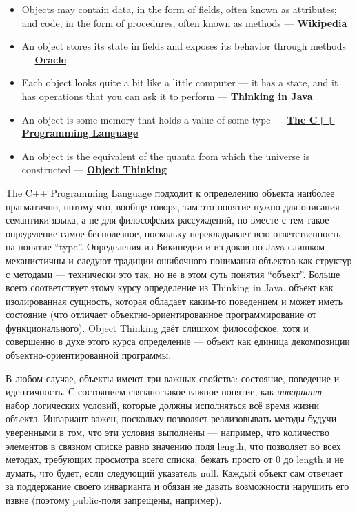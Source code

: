 \documentclass[a5paper]{article}
\begin{document}
\begin{itemize}
	\item Objects may contain data, in the form of fields, often known as attributes; and code, in the form of procedures, often known as methods --- \textbf{\href{https://en.wikipedia.org/wiki/Object-oriented\_programming}{Wikipedia}}
	\item An object stores its state in fields and exposes its behavior through methods --- \textbf{\href{https://docs.oracle.com/javase/tutorial/java/concepts/object.html}{Oracle}}
	\item Each object looks quite a bit like a little computer --- it has a state, and it has operations that you can ask it to perform --- \textbf{\href{http://amzn.to/1PBmQpm}{Thinking in Java}}
	\item An object is some memory that holds a value of some type --- \textbf{\href{http://amzn.to/1XyGCtk}{The C++ Programming Language}}
	\item An object is the equivalent of the quanta from which the universe is constructed --- \textbf{\href{http://amzn.to/266oJr4}{Object Thinking}}
\end{itemize}

The C++ Programming Language подходит к определению объекта наиболее прагматично, потому что, вообще говоря, там это понятие нужно для описания семантики языка, а не для философских рассуждений, но вместе с тем такое определение самое бесполезное, поскольку перекладывает всю ответственность на понятие ``type''. Определения из Википедии и из доков по Java слишком механистичны и следуют традиции ошибочного понимания объектов как структур с методами --- технически это так, но не в этом суть понятия ``объект''. Больше всего соответствует этому курсу определение из Thinking in Java, объект как изолированная сущность, которая обладает каким-то поведением и может иметь состояние (что отличает объектно-ориентированное программирование от функционального). Object Thinking даёт слишком философское, хотя и совершенно в духе этого курса определение --- объект как единица декомпозиции объектно-ориентированной программы.

В любом случае, объекты имеют три важных свойства: состояние, поведение и идентичность. С состоянием связано такое важное понятие, как \textit{инвариант} --- набор логических условий, которые должны исполняться всё время жизни объекта. Инвариант важен, поскольку позволяет реализовывать методы будучи уверенными в том, что эти условия выполнены --- например, что количество элементов в связном списке равно значению поля length, что позволяет во всех методах, требующих просмотра всего списка, бежать просто от 0 до length и не думать, что будет, если следующий указатель null. Каждый объект сам отвечает за поддержание своего инварианта и обязан не давать возможности нарушить его извне (поэтому public-поля запрещены, например).
\end{document}
